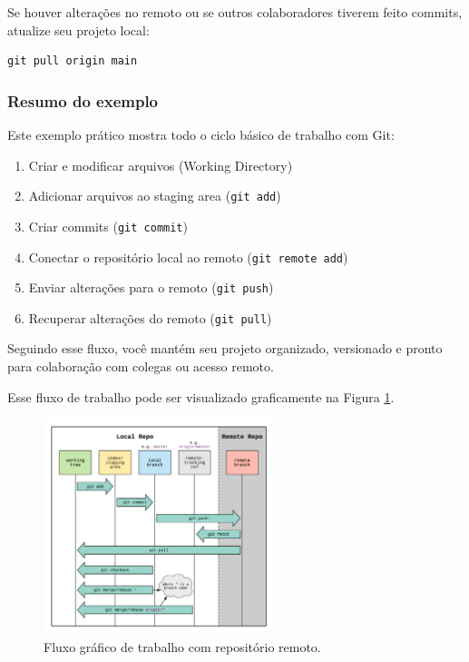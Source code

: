 Se houver alterações no remoto ou se outros colaboradores tiverem feito commits, atualize seu projeto local:

\begin{lstlisting}[style=shellstyle]
git pull origin main
\end{lstlisting}

\subsubsection*{Resumo do exemplo}

Este exemplo prático mostra todo o ciclo básico de trabalho com Git:

\begin{enumerate}
    \item Criar e modificar arquivos (Working Directory)
    \item Adicionar arquivos ao staging area (\texttt{git add})
    \item Criar commits (\texttt{git commit})
    \item Conectar o repositório local ao remoto (\texttt{git remote add})
    \item Enviar alterações para o remoto (\texttt{git push})
    \item Recuperar alterações do remoto (\texttt{git pull})
\end{enumerate}

Seguindo esse fluxo, você mantém seu projeto organizado, versionado e pronto para colaboração com colegas ou acesso remoto.

Esse fluxo de trabalho pode ser visualizado graficamente na Figura \ref{fig:github_areas_flow}.

\begin{figure}[H]
\centering
\includegraphics[width=0.6\textwidth]{imgs/github_areas_flow.png}
\caption{Fluxo gráfico de trabalho com repositório remoto.}
\label{fig:github_areas_flow}
\end{figure}